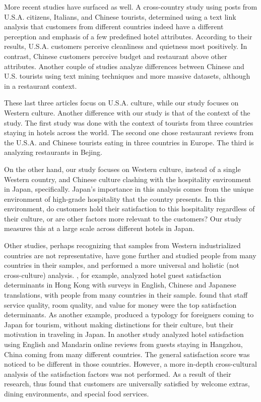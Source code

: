 \documentclass[smallextended,natbib]{svjour3}       %
\begin{document}
    More recent studies have surfaced as well. A cross-country study \cite[][]{FRANCESCO201924} using posts from U.S.A. citizens, Italians, and Chinese tourists, determined using a text link analysis that customers from different countries indeed have a different perception and emphasis of a few predefined hotel attributes. According to their results, U.S.A. customers perceive cleanliness and quietness most positively. In contrast, Chinese customers perceive budget and restaurant above other attributes. Another couple of studies \cite[][]{JIA2020104071, HUANG2017117} analyze differences between Chinese and U.S. tourists using text mining techniques and more massive datasets, although in a restaurant context. 

    These last three articles focus on U.S.A. culture, while our study focuses on Western culture. Another difference with our study is that of the context of the study. The first study \cite[][]{FRANCESCO201924} was done with the context of tourists from three countries staying in hotels across the world. The second one chose restaurant reviews from the U.S.A. and Chinese tourists eating in three countries in Europe. The third is analyzing restaurants in Bejing.

    On the other hand, our study focuses on Western culture, instead of a single Western country, and Chinese culture clashing with the hospitality environment in Japan, specifically. Japan's importance in this analysis comes from the unique environment of high-grade hospitality that the country presents. In this environment, do customers hold their satisfaction to this hospitality regardless of their culture, or are other factors more relevant to the customers? Our study measures this at a large scale across different hotels in Japan. 

    Other studies, perhaps recognizing that samples from Western industrialized countries are not representative, have gone further and studied people from many countries in their samples, and performed a more universal and holistic (not cross-culture) analysis. \cite{choi2001}, for example, analyzed hotel guest satisfaction determinants in Hong Kong with surveys in English, Chinese and Japanese translations, with people from many countries in their sample. \cite{choi2001} found that staff service quality, room quality, and value for money were the top satisfaction determinants. As another example, \cite{Uzama2012} produced a typology for foreigners coming to Japan for tourism, without making distinctions for their culture, but their motivation in traveling in Japan. In another study \cite{zhou2014} analyzed hotel satisfaction using English and Mandarin online reviews from guests staying in Hangzhou, China coming from many different countries. The general satisfaction score was noticed to be different in those countries. However, a more in-depth cross-cultural analysis of the satisfaction factors was not performed. As a result of their research, \cite{zhou2014} thus found that customers are universally satisfied by welcome extras, dining environments, and special food services. 
\end{document}
